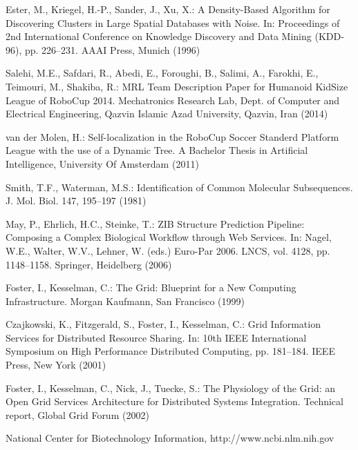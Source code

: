 \documentclass[lnicst,a4paper]{svmultln}
\begin{document}
\begin{thebibliography}{5}

 Ester, M., Kriegel, H.-P., Sander, J., Xu, X.:
A Density-Based Algorithm for Discovering Clusters in Large Spatial Databases with Noise.
In: Proceedings of 2nd International Conference on Knowledge Discovery and Data Mining (KDD-96),
pp. 226--231. AAAI Press, Munich (1996)

 Salehi, M.E., Safdari, R., Abedi, E., Foroughi, B., Salimi, A., Farokhi, E., Teimouri, M., Shakiba, R.: MRL Team Description Paper for Humanoid KidSize League of RoboCup 2014. 
Mechatronics Research Lab, Dept. of Computer and Electrical Engineering,
Qazvin Islamic Azad University, Qazvin, Iran (2014)

 van der Molen, H.: Self-localization in the RoboCup Soccer Standerd Platform League with the use of a Dynamic Tree. A Bachelor Thesis in Artificial Intelligence, University Of Amsterdam (2011)

 Smith, T.F., Waterman, M.S.: Identification of Common Molecular
Subsequences. J. Mol. Biol. 147, 195--197 (1981)

 May, P., Ehrlich, H.C., Steinke, T.: ZIB Structure Prediction Pipeline:
Composing a Complex Biological Workflow through Web Services. In: Nagel,
W.E., Walter, W.V., Lehner, W. (eds.) Euro-Par 2006. LNCS, vol. 4128,
pp. 1148--1158. Springer, Heidelberg (2006)

 Foster, I., Kesselman, C.: The Grid: Blueprint for a New Computing
Infrastructure. Morgan Kaufmann, San Francisco (1999)

 Czajkowski, K., Fitzgerald, S., Foster, I., Kesselman, C.: Grid
Information Services for Distributed Resource Sharing. In: 10th IEEE
International Symposium on High Performance Distributed Computing, pp.
181--184. IEEE Press, New York (2001)

 Foster, I., Kesselman, C., Nick, J., Tuecke, S.: The Physiology of the
Grid: an Open Grid Services Architecture for Distributed Systems
Integration. Technical report, Global Grid Forum (2002)

 National Center for Biotechnology Information, http://www.ncbi.nlm.nih.gov


\end{thebibliography}
\end{document}
